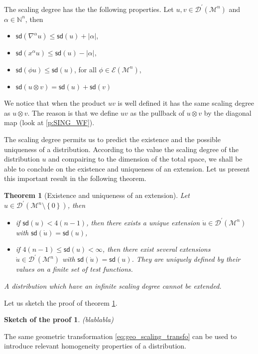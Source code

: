 \documentclass[12pt]{book}
\newcommand{\sd}{\mathsf{sd}}
\newcommand{\abs}[1]{\left|#1\right|}
\newcommand{\Dcal}{\mathcal{D}}
\newcommand{\Ecal}{\mathcal{E}}
\newcommand{\Mcal}{\mathcal{M}}
\newcommand{\Nbb}{\mathbb{N}}
\theoremstyle{break}
\newtheorem{theorem}{Theorem}
\newtheorem{sketch}{Sketch of the proof}
\begin{document}
The scaling degree has the the following properties. Let $u, v \in\Dcal^\prime(\Mcal^n)$ and $\alpha \in \Nbb^n$, then
%
\begin{itemize}
\setlength\itemsep{0pt}
\item $\sd(\nabla^\alpha u) \leq \sd(u) + \abs{\alpha}$,
\item $\sd(x^\alpha u) \leq \sd(u) - \abs{\alpha}$,
\item $\sd(\phi u) \leq \sd(u)$, for all $\phi \in \Ecal(\Mcal^n)$, 
\item $\sd(u \otimes v) = \sd(u) + \sd(v)$
\end{itemize}
%
We notice that when the product $uv$ is well defined it has the same scaling degree as $u \otimes v$. The reason is that we define $uv$ as the pullback of $u \otimes v$ by the diagonal map (look at \ref{p:SING_WF}).


The scaling degree permits us to predict the existence and the possible uniqueness of a distribution. According to the value the scaling degree of the distribution $u$ and compairing to the dimension of the total space, we shall be able to conclude on the existence and uniqueness of an extension. Let us present this important result in the following theorem.


\begin{theorem}[Existence and uniqueness of an extension] \label{theo:extension_distribution}
Let $u \in \Dcal^\prime(\Mcal^n \setminus\left\{ 0\right\} )$, then
%
\vspace*{-5pt}
\begin{itemize}
\setlength\itemsep{0pt}
\item if $\sd(u) < 4(n-1)$, then there exists a unique extension $\dot{u} \in \Dcal^\prime(\Mcal^n)$ with $\sd(\dot{u})=\sd(u)$,
%
\item if $4(n-1)\leq\sd(u)<\infty$, then there exist several extensions $\dot{u} \in \Dcal^\prime(\Mcal^n)$ with $\sd(\dot{u})=\sd(u)$. They are uniquely defined by their values on a finite set of test functions.
\end{itemize}
%
A distribution which have an infinite scaling degree cannot be extended.
\end{theorem}


 Let us sketch the proof of theorem \ref{theo:extension_distribution}.


\begin{sketch}
(blablabla)
\end{sketch}


The same geometric transformation \eqref{eq:geo_scaling_transfo} can be used to introduce relevant homogeneity properties of a distribution.
\end{document}
